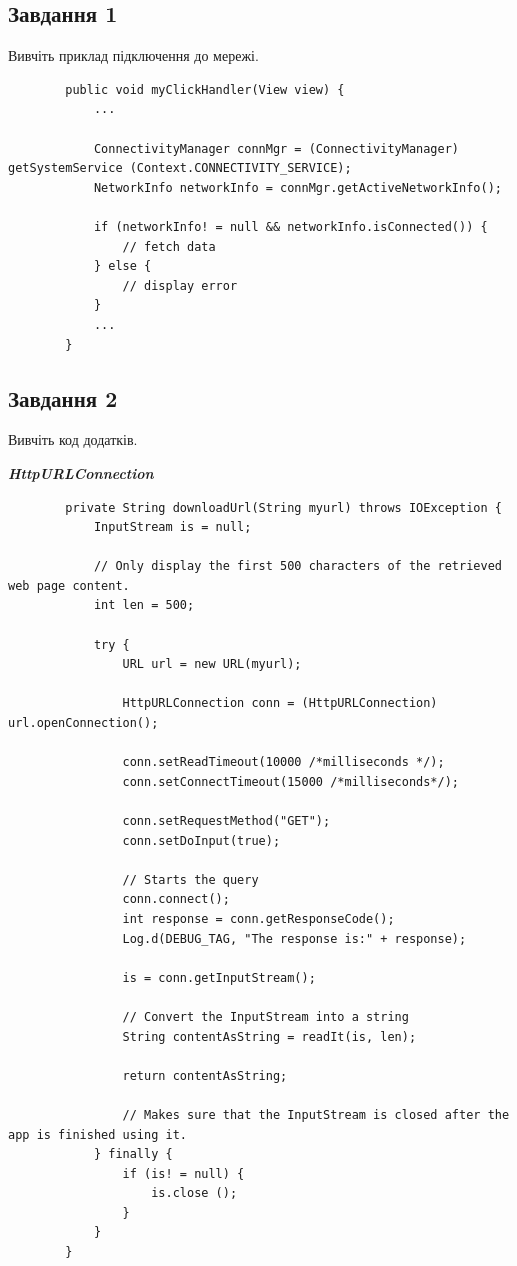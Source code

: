 \documentclass[14pt, a4paper]{extreport}
\begin{document}
	\subsection*{Завдання 1}
	
	Вивчіть приклад підключення до мережі. 
	
	\begin{verbatim}
		public void myClickHandler(View view) {
			...
			
			ConnectivityManager connMgr = (ConnectivityManager) getSystemService (Context.CONNECTIVITY_SERVICE);
			NetworkInfo networkInfo = connMgr.getActiveNetworkInfo();
			
			if (networkInfo! = null && networkInfo.isConnected()) {
				// fetch data
			} else {
				// display error
			}
			...
		}
	\end{verbatim}
	
	\subsection*{Завдання 2}
	
	Вивчіть код додатків.
	
	\textbf{\textit{HttpURLConnection}}
	
	\begin{verbatim}
		private String downloadUrl(String myurl) throws IOException {
			InputStream is = null;
			
			// Only display the first 500 characters of the retrieved web page content. 
			int len = 500;
			
			try {
				URL url = new URL(myurl);
				
				HttpURLConnection conn = (HttpURLConnection) url.openConnection();
				
				conn.setReadTimeout(10000 /*milliseconds */);
				conn.setConnectTimeout(15000 /*milliseconds*/); 
				
				conn.setRequestMethod("GET");
				conn.setDoInput(true);
				
				// Starts the query 
				conn.connect();
				int response = conn.getResponseCode();
				Log.d(DEBUG_TAG, "The response is:" + response);
				
				is = conn.getInputStream();
				
				// Convert the InputStream into a string 
				String contentAsString = readIt(is, len);
				
				return contentAsString;
				
				// Makes sure that the InputStream is closed after the app is finished using it.
			} finally {
				if (is! = null) {
					is.close ();
				}
			}
		}
	\end{verbatim}
	
\end{document}
